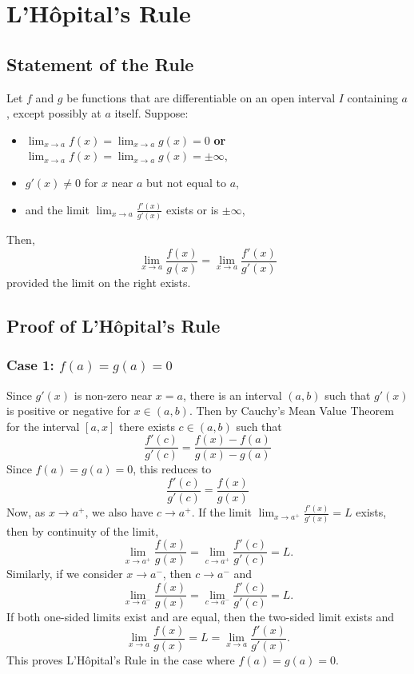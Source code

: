 \documentclass[11pt]{article}
\begin{document}
\pagestyle{plain}
\begin{center}
  \tableofcontents
\end{center}
\newpage
\setcounter{page}{1}
\pagestyle{fancy}
\section*{L'Hôpital's Rule}
\subsection*{Statement of the Rule}
Let $f$ and $g$ be functions that are differentiable on an open interval $I$ containing $a$, except possibly at $a$ itself. Suppose:
\begin{itemize}
    \item $\displaystyle \lim_{x \to a} f(x) = \lim_{x \to a} g(x) = 0$ \quad \textbf{or} \quad $\displaystyle \lim_{x \to a} f(x) = \lim_{x \to a} g(x) = \pm \infty$,
    \item $g'(x) \ne 0$ for $x$ near $a$ but not equal to $a$,
    \item and the limit $\displaystyle \lim_{x \to a} \frac{f'(x)}{g'(x)}$ exists or is $\pm \infty$,
\end{itemize}
Then,
\[
    \lim_{x \to a} \frac{f(x)}{g(x)} = \lim_{x \to a} \frac{f'(x)}{g'(x)}
\]
provided the limit on the right exists.
\subsection*{Proof of L'Hôpital's Rule}
\subsubsection*{Case 1: $f(a)=g(a)=0$}
Since $g'(x)$ is non-zero near $x=a$, there is an interval $(a,b)$ such that $g'(x)$ is positive or negative for $x\in (a,b)$. Then by Cauchy's Mean Value Theorem for the interval $[a,x]$ there exists $c\in (a,b)$ such that 
\[
  \frac{f'(c)}{g'(c)}=\frac{f(x)-f(a)}{g(x)-g(a)}
\]
Since $f(a)=g(a)=0$, this reduces to 
\[
  \frac{f'(c)}{g'(c)}=\frac{f(x)}{g(x)}
\]
Now, as $x \to a^+$, we also have $c \to a^+$. If the limit $\displaystyle \lim_{x \to a^+} \frac{f'(x)}{g'(x)} = L$ exists, then by continuity of the limit,
\[
  \lim_{x \to a^+} \frac{f(x)}{g(x)} = \lim_{c \to a^+} \frac{f'(c)}{g'(c)} = L.
\]
Similarly, if we consider $x \to a^-$, then $c \to a^-$ and
\[
  \lim_{x \to a^-} \frac{f(x)}{g(x)} = \lim_{c \to a^-} \frac{f'(c)}{g'(c)} = L.
\]
If both one-sided limits exist and are equal, then the two-sided limit exists and
\[
  \lim_{x \to a} \frac{f(x)}{g(x)} = L = \lim_{x \to a} \frac{f'(x)}{g'(x)}.
\]
This proves L'Hôpital's Rule in the case where $f(a) = g(a) = 0$.
\end{document}
